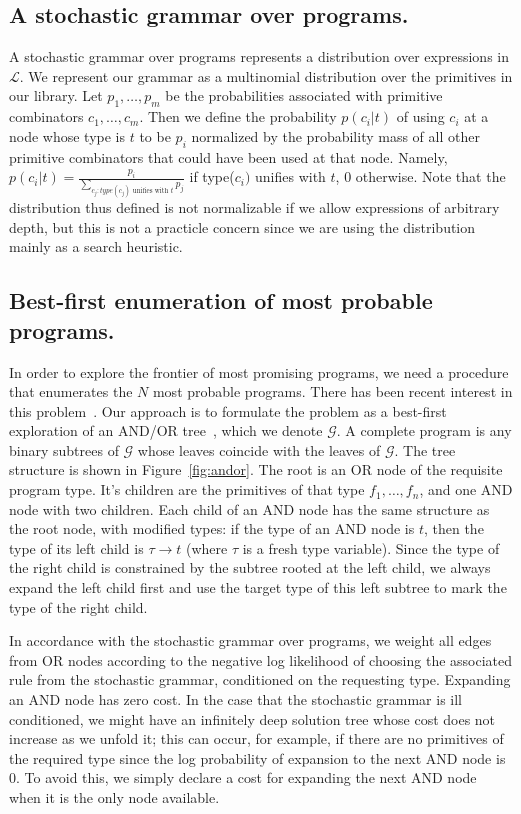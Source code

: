 \documentclass{article}
\begin{document}
\subsection{A stochastic grammar over programs.}
A stochastic grammar over programs represents a distribution over
expressions in $\mathcal{L}$. We represent our grammar as a
multinomial distribution over the primitives in our library. Let $p_1,
\dots, p_m$ be the probabilities associated with primitive combinators
$c_1, \dots, c_m$. Then we define the probability $p(c_i | t) $ of
using $c_i$ at a node whose type is $t$ to be $p_i$ normalized by the
probability mass of all other primitive combinators that could have
been used at that node. Namely, $p(c_i | t) = \frac{p_i}{\sum_{c_j :
    type(c_j) \text{ unifies with } t} p_j}$ if type($c_i)$ unifies
with $t$, 0 otherwise. Note that the distribution thus defined is not
normalizable if we allow expressions of arbitrary depth, but this is
not a practicle concern since we are using the distribution mainly as
a search heuristic.


\subsection{Best-first enumeration of most probable programs.}
In order to explore the frontier of most promising programs, we need a
procedure that enumerates the $N$ most probable programs. There has
been recent interest in this
problem~\cite{DBLP:conf/sfp/Katayama05}\cite{DBLP:conf/aaip/YakushevJ09}. Our
approach is to formulate the problem as a best-first exploration of an
AND/OR tree~\cite{nilsson1982principles}, which we denote
$\mathcal{G}$. A complete program is any binary subtrees of
$\mathcal{G}$ whose leaves coincide with the leaves of
$\mathcal{G}$. The tree structure is shown in
Figure~\ref{fig:andor}. The root is an OR node of the requisite
program type. It's children are the primitives of that type $f_1,
\dots, f_n$, and one AND node with two children. Each child of an AND
node has the same structure as the root node, with modified types: if
the type of an AND node is $t$, then the type of its left child is
$\tau \rightarrow t$ (where $\tau$ is a fresh type variable). Since
the type of the right child is constrained by the subtree rooted at
the left child, we always expand the left child first and use the
target type of this left subtree to mark the type of the right child.

In accordance with the stochastic grammar over programs, we weight all
edges from OR nodes according to the negative log likelihood of
choosing the associated rule from the stochastic grammar, conditioned
on the requesting type. Expanding an AND node has zero cost. In the
case that the stochastic grammar is ill conditioned, we might have an
infinitely deep solution tree whose cost does not increase as we
unfold it; this can occur, for example, if there are no primitives of
the required type since the log probability of expansion to the next
AND node is 0. To avoid this, we simply declare a cost for
expanding the next AND node when it is the only node available.
\end{document}
